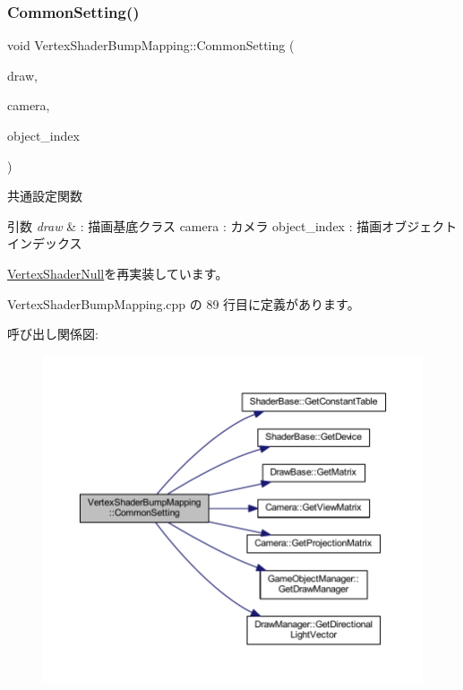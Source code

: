 \subsubsection{\texorpdfstring{Common\+Setting()}{CommonSetting()}}
{\footnotesize\ttfamily void Vertex\+Shader\+Bump\+Mapping\+::\+Common\+Setting (\begin{DoxyParamCaption}\item[{\mbox{\hyperlink{class_draw_base}{Draw\+Base}} $\ast$}]{draw,  }\item[{\mbox{\hyperlink{class_camera}{Camera}} $\ast$}]{camera,  }\item[{unsigned}]{object\+\_\+index }\end{DoxyParamCaption})\hspace{0.3cm}{\ttfamily [virtual]}}



共通設定関数 


\begin{DoxyParams}{引数}
{\em draw} & \+: 描画基底クラス camera \+: カメラ object\+\_\+index \+: 描画オブジェクトインデックス \\
\hline
\end{DoxyParams}


\mbox{\hyperlink{class_vertex_shader_null_a95f1a66045fb39c42cf0566f1990b6a1}{Vertex\+Shader\+Null}}を再実装しています。



 Vertex\+Shader\+Bump\+Mapping.\+cpp の 89 行目に定義があります。

呼び出し関係図\+:\nopagebreak
\begin{figure}[H]
\begin{center}
\leavevmode
\includegraphics[width=350pt]{class_vertex_shader_bump_mapping_a7979584d035fff86d386c99617a8dd2c_cgraph}
\end{center}
\end{figure}
\mbox{\label{class_vertex_shader_bump_mapping_a6c0f59d1f29fd883943a66bfe61b6b03}} 
